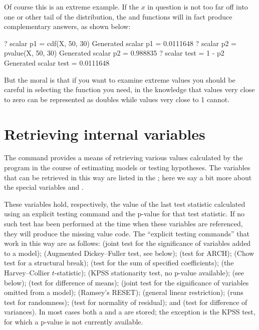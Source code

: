 Of course this is an extreme example.  If the $x$ in question is not
too far off into one or other tail of the distribution, the 
and  functions will in fact produce complementary
answers, as shown below:
\begin{code}
? scalar p1 = cdf(X, 50, 30)
Generated scalar p1 = 0.0111648
? scalar p2 = pvalue(X, 50, 30)
Generated scalar p2 = 0.988835
? scalar test = 1 - p2
Generated scalar test = 0.0111648
\end{code}
But the moral is that if you want to examine extreme values
you should be careful in selecting the function you need, in the
knowledge that values very close to zero can be represented as doubles
while values very close to 1 cannot.


\section{Retrieving internal variables}
\label{sec:genr-internal}

The  command provides a means of retrieving various values
calculated by the program in the course of estimating models or
testing hypotheses.  The variables that can be retrieved in this way
are listed in the \GCR; here we say a bit more about the special
variables  and .

These variables hold, respectively, the value of the last test
statistic calculated using an explicit testing command and the p-value
for that test statistic.  If no such test has been performed at the
time when these variables are referenced, they will produce the
missing value code.  The ``explicit testing commands'' that work in
this way are as follows:  (joint test for the significance of
variables added to a model);  (Augmented Dickey--Fuller test,
see below);  (test for ARCH);  (Chow test for a
structural break);  (test for the sum of specified
coefficients);  (the Harvey--Collier $t$-statistic);
 (KPSS stationarity test, no p-value available);
 (see below);  (test for difference of
means);  (joint test for the significance of variables
omitted from a model);  (Ramsey's RESET); 
(general linear restriction);  (runs test for randomness);
 (test for normality of residual); and 
(test for difference of variances). In most cases both a 
and a  are stored; the exception is the KPSS test, for
which a p-value is not currently available.
    

